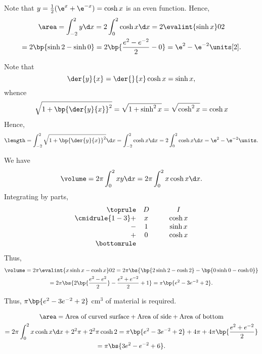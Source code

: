 \begin{solution}
\begin{ppart}
\begin{center}
        \end{center}
    \end{ppart}
    \begin{ppart}
        Note that $y = \frac12 (\e^x + \e^{-x}) = \cosh x$ is an even function. Hence,
        \begin{gather*}
            \area = \int_{-2}^2 y \d x = 2 \int_0^2 \cosh x \d x = 2 \evalint{\sinh x}02 \\
            = 2 \bp{\sinh 2 - \sinh 0} = 2 \bp{\frac{e^2 - e^{-2}}{2} - 0} = \e^2 - \e^{-2} \units[2].
        \end{gather*}
    \end{ppart}
    \begin{ppart}
        Note that \[\der{y}{x} = \der{}{x} \cosh x = \sinh x,\] whence \[\sqrt{1 + \bp{\der{y}{x}}^2} = \sqrt{1 + \sinh^2 x} = \sqrt{\cosh^2 x} = \cosh x\] Hence, \[\length = \int_{-2}^2 \sqrt{1 + \bp{\der{y}{x}}^2} \d x = \int_{-2}^2 \cosh x \d x = 2 \int_0^2 \cosh x \d x = \e^2 - \e^{-2} \units.\]
    \end{ppart}
    \begin{ppart}
        We have \[\volume = 2\pi \int_0^2 xy \d x = 2\pi \int_0^2 x \cosh x \d x.\] Integrating by parts, 
        \[\begin{array}{r c @{\hspace*{1.0cm}} c}\toprule
            & D & I \\\cmidrule{1-3}
            + & x & \cosh x\\
            - & 1 & \sinh x \\
            + & 0 & \cosh x\\\bottomrule
        \end{array}\] Thus,
        \begin{gather*}
            \volume = 2\pi \evalint{x\sinh x - \cosh x}02 = 2\pi \bs{\bp{2\sinh 2 - \cosh 2} - \bp{0\sinh 0 - \cosh 0}} \\
            = 2\pi \bs{2 \bp{\frac{e^2 - e^2}2} - \frac{e^2 + e^{-2}}2 + 1} = \pi \bp{e^2 - 3e^{-2} + 2}.
        \end{gather*}

        Thus, $\pi \bp{e^2 - 3e^{-2} + 2}$ cm$^3$ of material is required.
    \end{ppart}
    \begin{ppart}
        \begin{gather*}
            \area = \text{Area of curved surface} + \text{Area of side} + \text{Area of bottom}\\
            = 2\pi \int_0^2 x\cosh x \d x + 2^2\pi + 2^2\pi\cosh 2 = \pi \bp{e^2 - 3e^{-2} + 2} + 4\pi + 4\pi \bp{\frac{e^2 + e^{-2}}2}\\
            = \pi \bs{3e^2 - e^{-2} + 6}.
        \end{gather*}


\end{ppart}
\end{solution}
